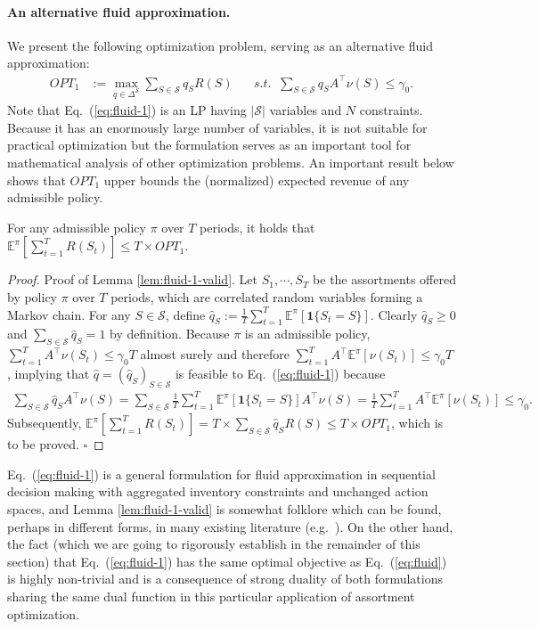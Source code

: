 \documentclass[opre]{informs3aa}
\newcommand{\vct}{\boldsymbol }
\renewcommand{\hat}{\widehat}
\newcommand{\mS}{\mathcal S}
\renewcommand{\hat}{\widehat}
\begin{document}
\begin{appendices}
{\paragraph{An alternative fluid approximation.} We present the following optimization problem, serving as an alternative fluid approximation:
\begin{align}
OPT_1 &:= \max_{q\in\Delta^{\mS}} \sum_{S\in\mS}q_S R(S) \;\;\;\;\;\;s.t.\;\; \sum_{S\in\mS}q_S A^\top\nu(S) \leq \gamma_0.
\label{eq:fluid-1}
\end{align}
Note that Eq.~(\ref{eq:fluid-1}) is an LP having $|\mS|$ variables and $N$ constraints. Because it has an enormously large number of variables, it is not suitable for practical optimization but the formulation serves as an important tool for mathematical analysis of other optimization problems.
An important result below shows that $OPT_1$ upper bounds the (normalized) expected revenue of any admissible policy.
\begin{lemma}
For any admissible policy $\pi$ over $T$ periods, it holds that $\mathbb E^\pi[\sum_{t=1}^T R(S_t)] \leq T\times OPT_1$.
\label{lem:fluid-1-valid}
\end{lemma}
\begin{proof}{Proof of Lemma \ref{lem:fluid-1-valid}.}
Let $S_1,\cdots,S_T$ be the assortments offered by policy $\pi$ over $T$ periods, which are correlated random variables forming a Markov chain.
For any $S\in\mS$, define $\hat q_S := \frac{1}{T}\sum_{t=1}^T\mathbb E^\pi[\vct 1\{S_t=S\}]$.
Clearly $\hat q_S\geq 0$ and $\sum_{S\in\mS}\hat q_S=1$ by definition.
Because $\pi$ is an admissible policy, $\sum_{t=1}^T A^\top\nu(S_t)\leq\gamma_0 T$ almost surely and therefore $\sum_{t=1}^T A^\top\mathbb E^\pi[\nu(S_t)]\leq\gamma_0 T$,
implying that $\hat q=(\hat q_S)_{S\in\mS}$ is feasible to Eq.~(\ref{eq:fluid-1}) because
\begin{align*}
\sum_{S\in\mathcal S}\hat q_S A^\top\nu(S) = \sum_{S\in\mathcal S}\frac{1}{T}\sum_{t=1}^T\mathbb E^\pi[\vct 1\{S_t=S\}] A^\top\nu(S) = \frac{1}{T}\sum_{t=1}^TA^\top\mathbb E^\pi[\nu(S_t)] \leq \gamma_0.
\end{align*}
Subsequently, $\mathbb E^\pi[\sum_{t=1}^T R(S_t)] = T\times \sum_{S\in\mS}\hat q_SR(S) \leq T\times OPT_1$, which is to be proved. $\square$
\end{proof}

{
\begin{remark}
Eq.~(\ref{eq:fluid-1}) is a general formulation for fluid approximation in sequential decision making with aggregated inventory constraints and unchanged action spaces, and Lemma \ref{lem:fluid-1-valid}
is somewhat folklore which can be found, perhaps in different forms, in many existing literature (e.g.~\cite{miao2021general}). 
On the other hand, the fact (which we are going to rigorously establish in the remainder of this section) that Eq.~(\ref{eq:fluid-1}) has the same optimal objective as Eq.~(\ref{eq:fluid}) is highly non-trivial and
is a consequence of strong duality of both formulations sharing the same dual function in this particular application of assortment optimization.
\end{remark}
}

}
\end{appendices}
\end{document}
